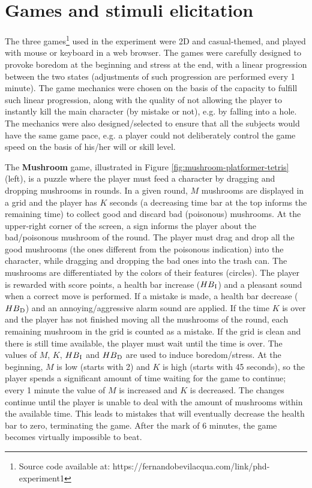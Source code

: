 \section{Games and stimuli elicitation}
\label{sec:experiment1-games-elicitation}

The three games\footnote{Source code available at: https://fernandobevilacqua.com/link/phd-experiment1} used in the experiment were 2D and casual-themed, and played with mouse or keyboard in a web browser. The games were carefully designed to provoke boredom at the beginning and stress at the end, with a linear progression between the two states (adjustments of such progression are performed every 1 minute). The game mechanics were chosen on the basis of the capacity to fulfill such linear progression, along with the quality of not allowing the player to instantly kill the main character (by mistake or not), e.g. by falling into a hole. The mechanics were also designed/selected to ensure that all the subjects would have the same game pace, e.g. a player could not deliberately control the game speed on the basis of his/her will or skill level.

The \textbf{Mushroom} game, illustrated in Figure \ref{fig:mushroom-platformer-tetris} (left), is a puzzle where the player must feed a character by dragging and dropping mushrooms in rounds. In a given round, $M$ mushrooms are displayed in a grid and the player has $K$ seconds (a decreasing time bar at the top informs the remaining time) to collect good and discard bad (poisonous) mushrooms. At the upper-right corner of the screen, a sign informs the player about the bad/poisonous mushroom of the round. The player must drag and drop all the good mushrooms (the ones different from the poisonous indication) into the character, while dragging and dropping the bad ones into the trash can. The mushrooms are differentiated by the colors of their features (circles). The player is rewarded with score points, a health bar increase ($HB\textsubscript{I}$) and a pleasant sound when a correct move is performed. If a mistake is made, a health bar decrease ($HB\textsubscript{D}$) and an annoying/aggressive alarm sound are applied. If the time $K$ is over and the player has not finished moving all the mushrooms of the round, each remaining mushroom in the grid is counted as a mistake. If the grid is clean and there is still time available, the player must wait until the time is over. The values of $M$, $K$, $HB\textsubscript{I}$ and $HB\textsubscript{D}$ are used to induce boredom/stress. At the beginning, $M$ is low (starts with 2) and $K$ is high (starts with 45 seconds), so the player spends a significant amount of time waiting for the game to continue; every 1 minute the value of $M$ is increased and $K$ is decreased. The changes continue until the player is unable to deal with the amount of mushrooms within the available time. This leads to mistakes that will eventually decrease the health bar to zero, terminating the game. After the mark of 6 minutes, the game becomes virtually impossible to beat.

